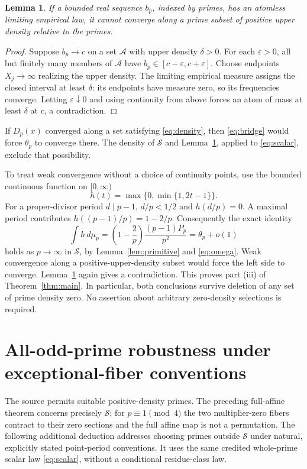 \documentclass[11pt]{article}
\newtheorem{lemma}[theorem]{Lemma}
\theoremstyle{remark}
\begin{document}
\begin{lemma}\label{lem:atom}
If a bounded real sequence $b_p$, indexed by primes, has an atomless
limiting empirical law, it cannot converge along a prime subset of
positive upper density relative to the primes.
\end{lemma}
\begin{proof}
Suppose $b_p\to c$ on a set $\mathcal A$ with upper density $\delta>0$.
For each $\varepsilon>0$, all but finitely many members of
$\mathcal A$ have $b_p\in[c-\varepsilon,c+\varepsilon]$.
Choose endpoints $X_j\to\infty$ realizing the upper density.
The limiting empirical measure assigns the closed interval at least
$\delta$: its endpoints have measure zero, so its frequencies converge.
Letting $\varepsilon\downarrow0$ and using continuity from above forces
an atom of mass at least $\delta$ at $c$, a contradiction.
\end{proof}

If $D_p(x)$ converged along a set satisfying \eqref{eq:density}, then
\eqref{eq:bridge} would force $\theta_p$ to converge there. The density
of $\mathcal S$ and Lemma~\ref{lem:atom}, applied to \eqref{eq:scalar},
exclude that possibility.

To treat weak convergence without a choice of continuity points, use
the bounded continuous function on $[0,\infty)$
\[
 h(t)=\max\{0,\min\{1,2t-1\}\}.
\]
For a proper-divisor period $d\mid p-1$, $d/p<1/2$ and $h(d/p)=0$.
A maximal period contributes $h((p-1)/p)=1-2/p$. Consequently the
exact identity
\begin{equation}\label{eq:moment}
 \int h\,d\mu_p
 =\left(1-\frac2p\right)\frac{(p-1)P_p}{p^2}
 =\theta_p+o(1)
\end{equation}
holds as $p\to\infty$ in $\mathcal S$, by
Lemma~\ref{lem:primitive} and \eqref{eq:omega}.
Weak convergence along a positive-upper-density subset would force
the left side to converge. Lemma~\ref{lem:atom} again gives a
contradiction. This proves part (iii) of Theorem~\ref{thm:main}.
In particular, both conclusions survive deletion of any set of prime
density zero. No assertion about arbitrary zero-density selections
is required.

\section{All-odd-prime robustness under exceptional-fiber conventions}
The source permits suitable positive-density primes. The preceding
full-affine theorem concerns precisely $\mathcal S$; for $p\equiv1\pmod4$
the two multiplier-zero fibers contract to their zero sections and the
full affine map is not a permutation. The following additional deduction
addresses choosing primes outside $\mathcal S$ under natural, explicitly
stated point-period conventions. It uses the same credited whole-prime
scalar law \eqref{eq:scalar}, without a conditional residue-class law.
\end{document}

